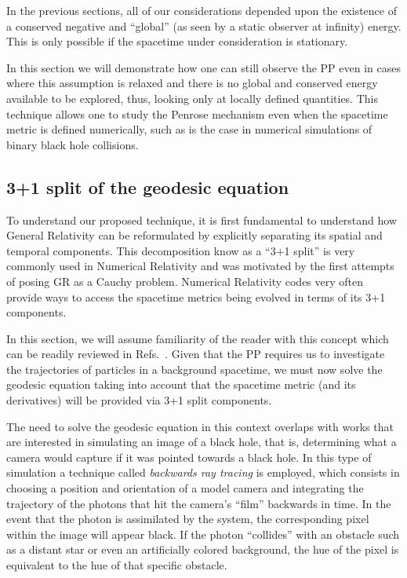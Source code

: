 In the previous sections, all of our considerations depended upon the existence of a conserved negative and ``global'' (as seen by a static observer at infinity) energy. This is only possible if the spacetime under consideration is stationary. 

In this section we will demonstrate how one can still observe the PP even in cases where this assumption is relaxed and there is no global and conserved energy available to be explored, thus, looking only at locally defined quantities. This technique allows one to study the Penrose mechanism even when the spacetime metric is defined numerically, such as is the case in numerical simulations of binary black hole collisions.

\subsection{3+1 split of the geodesic equation}

To understand our proposed technique, it is first fundamental to understand how General Relativity can be reformulated by explicitly separating its spatial and temporal components. This decomposition know as a ``3+1 split'' is very commonly used in Numerical Relativity and was motivated by the first attempts of posing GR as a Cauchy problem. Numerical Relativity codes very often provide ways to access the spacetime metrics being evolved in terms of its 3+1 components.

In this section, we will assume familiarity of the reader with this concept which can be readily reviewed in Refs.~\cite{Alcubierre2012-xp, 9780521514071, 9781108928250}. Given that the PP requires us to investigate the trajectories of particles in a background spacetime, we must now solve the geodesic equation taking into account that the spacetime metric (and its derivatives) will be provided via 3+1 split components. 

The need to solve the geodesic equation in this context overlaps with works that are interested in simulating an image of a black hole, that is, determining what a camera would capture if it was pointed towards a black hole. In this type of simulation a technique called \emph{backwards ray tracing} is employed, which consists in choosing a position and orientation of a model camera and integrating the trajectory of the photons that hit the camera's ``film'' backwards in time. In the event that the photon is assimilated by the system, the corresponding pixel within the image will appear black. If the photon ``collides'' with an obstacle such as a distant star or even an artificially colored background, the hue of the pixel is equivalent to the hue of that specific obstacle.

